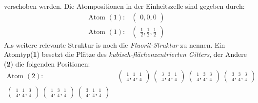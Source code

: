 verschoben werden. Die Atompositionen in der Einheitszelle
sind gegeben durch:
\begin{align}
  \label{eqn:7*}
  \text{Atom }(1) :&
  \begin{pmatrix}
    0, 0, 0
  \end{pmatrix}\\
  \label{eqn:8*}
  \text{Atom }(1) :&
  \begin{pmatrix}
    \frac{1}{2}, \frac{1}{2}, \frac{1}{2}
  \end{pmatrix}
\end{align}
Als weitere relevante Struktur is noch die
\textit{Fluorit-Struktur} zu nennen.
Ein Atomtyp(\textbf{1}) besetzt die Plätze des
\textit{kubisch-flächenzentrierten Gitters},
der Andere (\textbf{2}) die folgenden
Positionen:
\begin{align}
  \label{eqn:9*}
  \text{Atom }(2) :&
  \begin{pmatrix}
    \frac{1}{4}, \frac{1}{4}, \frac{1}{4}
  \end{pmatrix}\
  \begin{pmatrix}
    \frac{3}{4}, \frac{3}{4}, \frac{1}{4}
  \end{pmatrix}\
  \begin{pmatrix}
    \frac{1}{4}, \frac{3}{4}, \frac{3}{4}
  \end{pmatrix}\
  \begin{pmatrix}
    \frac{3}{4}, \frac{3}{4}, \frac{3}{4}
  \end{pmatrix}\\
  \begin{pmatrix}
    \frac{1}{4}, \frac{1}{4}, \frac{3}{4}
  \end{pmatrix}\
  \begin{pmatrix}
    \frac{1}{4}, \frac{3}{4}, \frac{1}{4}
  \end{pmatrix}\
  \begin{pmatrix}
    \frac{3}{4}, \frac{1}{4}, \frac{1}{4}
  \end{pmatrix}\
\end{align}



